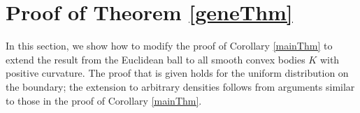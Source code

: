 
\section{Proof of Theorem \ref{geneThm}}\label{pfthm1}
In this section, we show how to modify the proof of Corollary \ref{mainThm}  to extend the result from the Euclidean ball to all smooth convex bodies $K$ with positive curvature. The proof that is given holds for the uniform distribution on the boundary; the extension to arbitrary densities follows from arguments similar to those in the proof of Corollary \ref{mainThm}. 

\vspace{1mm}

